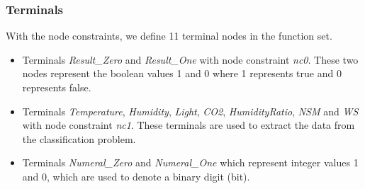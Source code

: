 \subsubsection{Terminals}
With the node constraints, we define 11 terminal nodes in the function set.
\begin{itemize}
	\item Terminals \emph{Result\_Zero} and \emph{Result\_One} with node constraint \emph{nc0}. These two nodes represent the boolean values 1 and 0 where 1 represents true and 0 represents false. 
	\item Terminals \emph{Temperature}, \emph{Humidity}, \emph{Light}, \emph{CO2}, \emph{HumidityRatio}, \emph{NSM} and \emph{WS} with node constraint \emph{nc1}. These terminals are used to extract the data from the classification problem. 
	\item Terminals \emph{Numeral\_Zero} and \emph{Numeral\_One} which represent integer values 1 and 0, which are used to denote a binary digit (bit).
\end{itemize}

